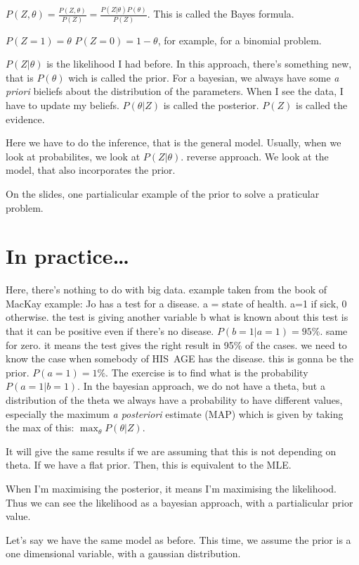 \documentclass[a4paper]{tufte-book}
\begin{document}
$P(Z,\theta) = \frac{P(Z,\theta)}{P(Z)} = \frac{P(Z|\theta)P(\theta)}{P(Z)}$.
This is called the Bayes formula.

$P(Z=1) = \theta$
$P(Z=0) = 1-\theta$, for example, for a binomial problem.

$P(Z|\theta)$ is the likelihood I had before.
In this approach, there's something new, that is $P(\theta)$ wich is called the prior.
For a bayesian, we always have some \emph{a priori} bieliefs about the
distribution of the parameters. When I see the data, I have to update my
beliefs.
$P(\theta|Z)$ is called the posterior.
$P(Z)$ is called the evidence.

Here we have to do the inference, that is the general model. Usually, when we
look at probabilites, we look at $P(Z|\theta)$. reverse approach.
We look at  the model, that also incorporates the prior.

On the slides, one partialicular example of the prior to solve a praticular problem.

\section{In practice\dots}
Here, there's nothing to do with big data. example taken from the book of MacKay
example: Jo has a test for a disease. a = state of health.
a=1 if sick, 0 otherwise.
the test is giving another variable b
what is known about this test is that it can be positive even if there's no
disease. $P(b=1|a=1) = 95\%$. same for zero.
it means the test gives the right result in 95\% of the cases.
we need to know the case when somebody of HIS AGE has the disease. this
is gonna be the prior. $P(a=1) = 1\%$.
The exercise is to find what is the probability $P(a=1|b=1)$.
In the bayesian approach, we do not have a theta, but a distribution of the theta
we always have a probability to have different values, especially the maximum
\emph{a posteriori} estimate (MAP)
which is given by taking the max of this:
$\max_\theta P(\theta|Z)$.

It will give the same results if we are assuming that this is not depending on theta. If we have a flat prior.
Then, this is equivalent to the MLE.

When I'm maximising the posterior, it means I'm maximising the likelihood.
Thus we can see the likelihood as a bayesian approach, with a partialicular prior
value.

Let's say we have the same model as before. This time, we assume the prior is
a one dimensional variable, with a gaussian distribution.
\end{document}
